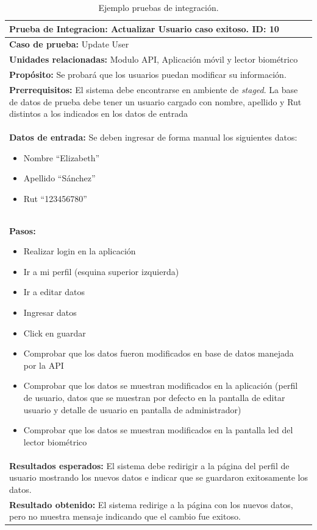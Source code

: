 \begin{table}[H]
    \caption[Ejemplo pruebas de integración.] {Ejemplo pruebas de integración.}
    \label{tbl:Ejemplo pruebas de integración}
    \begin{tabular}{|p{}|}
        \hline
        \textbf{Prueba de Integracion: Actualizar Usuario caso exitoso. \hfill ID: 10} \\
    	\hline
    	\hline
    	\textbf{Caso de prueba:} Update User\\ \hline
    	\textbf{Unidades relacionadas:} Modulo API, Aplicación móvil y lector biométrico\\ \hline
    	\textbf{Propósito:} Se probará que los usuarios puedan modificar su información.\\ \hline
    	\textbf{Prerrequisitos:} El sistema debe encontrarse en ambiente de \textit{staged}. La base de datos de prueba debe tener un usuario cargado con nombre, apellido y Rut distintos a los indicados en los datos de entrada\\ \hline
		\textbf{Datos de entrada:} Se deben ingresar de forma manual los siguientes datos:
		\begin{itemize}
			\item Nombre “Elizabeth”
			\item Apellido “Sánchez”
			\item Rut “123456780”
		\end{itemize} \\ \hline
		\textbf{Pasos:} 
		\begin{itemize}
			\item Realizar login en la aplicación
			\item Ir a mi perfil (esquina superior izquierda) 
			\item Ir a editar datos
			\item Ingresar datos
			\item Click en guardar
			\item Comprobar que los datos fueron modificados en base de datos manejada por la API
			\item Comprobar que los datos se muestran modificados en la aplicación (perfil de usuario, datos que se muestran por defecto en la pantalla de editar usuario y detalle de usuario en pantalla de administrador)
			\item Comprobar que los datos se muestran modificados en la pantalla led del lector biométrico
		\end{itemize}\\ \hline
		\textbf{Resultados esperados:} El sistema debe redirigir a la página del perfil de usuario mostrando los nuevos datos e indicar que se guardaron exitosamente los datos. \\ \hline
		\textbf{Resultado obtenido:} El sistema redirige a la página con los nuevos datos, pero no muestra mensaje indicando que el cambio fue exitoso.\\ \hline
    \end{tabular}
\end{table}

